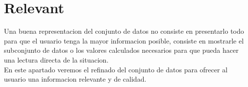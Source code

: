 \newpage
\section{Relevant}
 
Una buena representacion del conjunto de datos no consiste en presentarlo todo para que el usuario tenga la mayor informacion posible,
consiste en mostrarle el subconjunto de datos o los valores calculados necesarios para que pueda hacer una lectura directa de la situacion.\\

En este apartado veremos el refinado del conjunto de datos para ofrecer al usuario una informacion relevante y de calidad.






